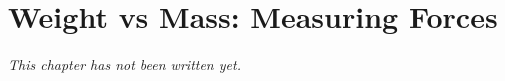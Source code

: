 \chapter{Weight vs Mass: Measuring Forces}\label{ch:g9:weight-vs-mass}


\emph{This chapter has not been written yet.}

